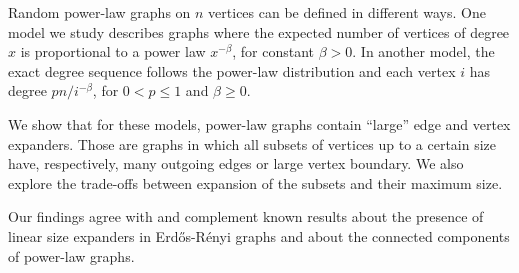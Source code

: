 
Random power-law graphs on $n$ vertices can be defined in different ways.
One model we study describes graphs where the expected number of vertices
of degree $x$ is proportional to a power law $x^{-\beta}$, for constant $\beta>0$.
In another model, the exact degree sequence follows the power-law distribution
and each vertex $i$ has degree $pn/i^{-\beta}$, for $0<p\leq 1$ and $\beta\geq 0$.

We show that for these models, power-law graphs contain
``large'' edge and vertex expanders.
Those are graphs in which all subsets of vertices up to a certain size have,
respectively, many outgoing edges or large vertex boundary.
We also explore the trade-offs between expansion of the subsets
and their maximum size.

Our findings agree with and complement known results
about the presence of linear size expanders in Erd\H{o}s-R\'enyi graphs
and about the connected components of power-law graphs.


